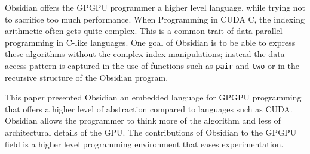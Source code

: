 
 


 

Obsidian offers the GPGPU programmer a higher level language, while trying 
not to sacrifice too much performance. When Programming in CUDA C, the indexing
arithmetic often gets quite complex. This is a common trait of data-parallel 
programming in C-like languages. One goal of Obsidian is to be able to express 
these algorithms without the complex index manipulations; instead the data 
access pattern is captured in the use of functions such as {\tt pair} and 
{\tt two} or in the recursive structure of the Obsidian program. 



This paper presented Obsidian an embedded language for GPGPU programming that
offers a higher level of abstraction compared to languages such as CUDA. 
Obsidian allows the programmer to think more of the algorithm and less of 
architectural details of the GPU. The contributions of Obsidian to the GPGPU 
field is a higher level programming environment that eases experimentation. 

